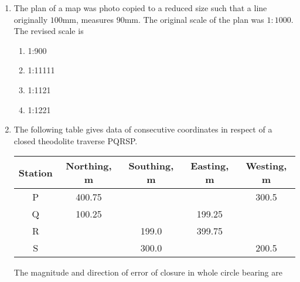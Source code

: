 \documentclass[journal]{IEEEtran}
\begin{document}
\begin{enumerate}
{\begin{multicols}{2}
\begin{enumerate}
					\item  P-4, Q-2, R-3, S-1  
					 
					\item  P-3, Q-2, R-1, S-4  
					
					\item  P-4, Q-1, R-2, S-2  
				\end{enumerate}
			\end{multicols}
			
		}
    \item{
        
           The plan of a map was photo copied to a reduced size such that a line originally $100$mm, measures $90$mm. The original scale of the plan was $1:1000$. The revised scale is 
             \hfill
              
              \begin{multicols}{4}
              	\begin{enumerate}
              		\item 1:900
              		\item 1:11111
              		\item 1:1121
              		\item 1:1221
              	\end{enumerate}
              \end{multicols}
        
        }
        \item{
        	
        	The following table gives data of consecutive coordinates in respect of a closed theodolite traverse PQRSP.
        	
        	\begin{center}
        		\begin{tabular}{|c|c|c|c|c|}
        			\hline
        			\textbf{Station} & \textbf{Northing, m} & \textbf{Southing, m} & \textbf{Easting, m} & \textbf{Westing, m} \\ \hline
        			P & 400.75 & & & 300.5 \\ \hline
        			Q & 100.25 & & 199.25 & \\ \hline
        			R & & 199.0 & 399.75 & \\ \hline
        			S & & 300.0 & & 200.5 \\ \hline
        		\end{tabular}
        	\end{center}
        	
        	The magnitude and direction of error of closure in whole circle bearing are
        	
}
\end{enumerate}
\end{document}
